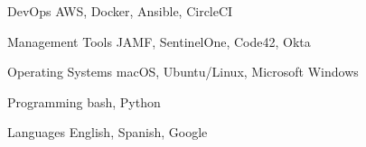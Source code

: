 

\begin{cvskills}

  \cvskill
    {DevOps} %
    {AWS, Docker, Ansible, CircleCI} %

  \cvskill
    {Management Tools} %
    {JAMF, SentinelOne, Code42, Okta} %

  \cvskill
    {Operating Systems} %
    {macOS, Ubuntu/Linux, Microsoft Windows} %

  \cvskill
    {Programming} %
    {bash, Python} %

  \cvskill
    {Languages} %
    {English, Spanish, Google} %

\end{cvskills}
